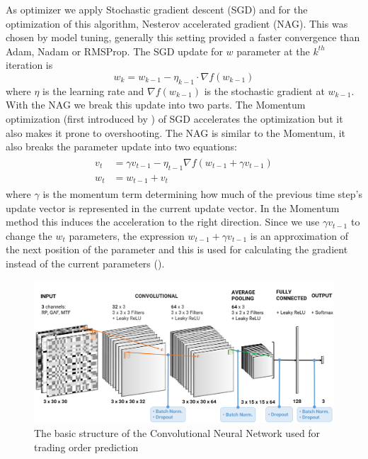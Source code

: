 \documentclass[12pt, a4paper]{article}
\begin{document}
As optimizer we apply Stochastic gradient descent (SGD) and for the optimization of this algorithm, Nesterov accelerated gradient (NAG). This was chosen by model tuning, generally this setting provided a faster convergence than Adam, Nadam or RMSProp. The SGD update for $w$ parameter at the $k^{th}$ iteration is
\begin{equation}
    \label{eq:SGD}
    w_k = w_{k-1} - \eta_{k-1} \cdot \nabla f(w_{k-1})
\end{equation}
where $\eta$ is the learning rate and $\nabla f(w_{k-1})$ is the stochastic gradient at $w_{k-1}$. With the NAG we break this update into two parts. The Momentum optimization (first introduced by \cite{polyak1964some}) of SGD accelerates the optimization but it also makes it prone to overshooting. The NAG is similar to the Momentum, it also breaks the parameter update into two equations:
\begin{align}
\label{eq:NAG}
    \begin{split}
        v_t &  = \gamma v_{t-1} - \eta_{t-1} \nabla f(w_{t-1} + \gamma v_{t-1}) \\
        w_t & = w_{t-1} + v_t 
    \end{split}
\end{align}
where $\gamma$ is the momentum term determining how much of the previous time step's update vector is represented in the current update vector. In the Momentum method this induces the acceleration to the right direction. Since we use $\gamma v_{t-1}$ to change the $w_t$ parameters, the expression $w_{t-1} + \gamma v_{t-1}$ is an approximation of the next position of the parameter and this is used for calculating the gradient instead of the current parameters (\cite{ruder2016overview}).

\begin{figure}[ht]
    \centering
    \includegraphics[width=\textwidth]{images/CNNCtrf.png}
    \caption{The basic structure of the Convolutional Neural Network used for trading order prediction}
    \label{fig:CNNstruct}
\end{figure}
\end{document}
